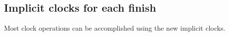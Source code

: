 

\subsection{Implicit clocks for each finish}


Most clock operations can be accomplished using the new implicit clocks.

